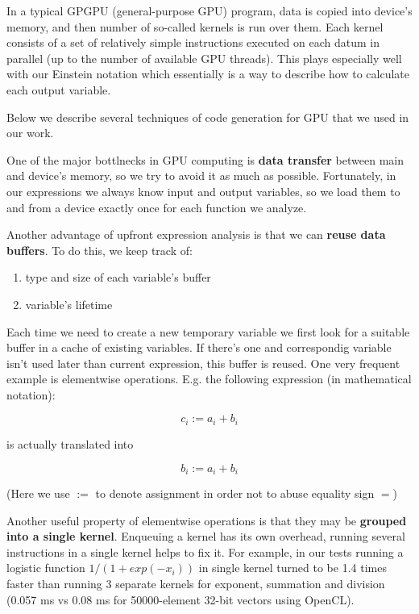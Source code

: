 \documentclass[conference]{IEEEtran}
\begin{document}
In a typical GPGPU (general-purpose GPU) program, data is copied into
device's memory, and then number of so-called kernels is run over
them. Each kernel consists of a set of relatively simple instructions
executed on each datum in parallel (up to the number of available GPU
threads). This plays especially well with our Einstein notation which
essentially is a way to describe how to calculate each output
variable.

Below we describe several techniques of code generation for GPU that
we used in our work.

One of the major bottlnecks in GPU computing is \textbf{data transfer}
between main and device's memory, so we try to avoid it as much as
possible. Fortunately, in our expressions we always know input and
output variables, so we load them to and from a device exactly once
for each function we analyze.

Another advantage of upfront expression analysis is that we can
\textbf{reuse data buffers}. To do this, we keep track of:

\begin{enumerate}
\item type and size of each variable's buffer
\item variable's lifetime
\end{enumerate}

Each time we need to create a new temporary variable we first look for
a suitable buffer in a cache of existing variables. If there's one and
correspondig variable isn't used later than current expression, this
buffer is reused. One very frequent example is elementwise operations.
E.g. the following expression (in mathematical notation):

$$c_i := a_i + b_i$$

is actually translated into

$$b_i := a_i + b_i$$


(Here we use $:=$ to denote assignment in order not to abuse equality
sign $=$)

Another useful property of elementwise operations is that they may be
\textbf{grouped into a single kernel}. Enqueuing a kernel has its own
overhead, running several instructions in a single kernel helps to fix
it. For example, in our tests running a logistic function
$1 / (1 + exp(-x_i))$ in single kernel turned to be 1.4 times faster
than running 3 separate kernels for exponent, summation and division
(0.057 ms vs 0.08 ms for 50000-element 32-bit vectors using OpenCL).
\end{document}
